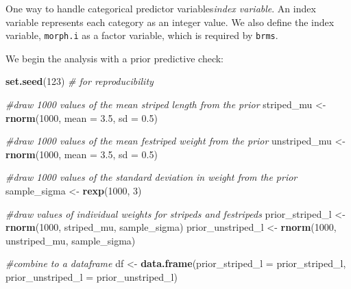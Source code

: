\documentclass[
]{book}
\newenvironment{Shaded}{\begin{snugshade}}{\end{snugshade}}
\newcommand{\AttributeTok}[1]{\textcolor[rgb]{0.13,0.29,0.53}{#1}}
\newcommand{\CommentTok}[1]{\textcolor[rgb]{0.56,0.35,0.01}{\textit{#1}}}
\newcommand{\DecValTok}[1]{\textcolor[rgb]{0.00,0.00,0.81}{#1}}
\newcommand{\FloatTok}[1]{\textcolor[rgb]{0.00,0.00,0.81}{#1}}
\newcommand{\FunctionTok}[1]{\textcolor[rgb]{0.13,0.29,0.53}{\textbf{#1}}}
\newcommand{\NormalTok}[1]{#1}
\newcommand{\OtherTok}[1]{\textcolor[rgb]{0.56,0.35,0.01}{#1}}
\begin{document}
One way to handle categorical predictor variables\emph{index variable}. An index variable represents each category as an integer value. We also define the index variable, \texttt{morph.i} as a factor variable, which is required by \texttt{brms}.

We begin the analysis with a prior predictive check:

\begin{Shaded}
\begin{Highlighting}[]
\FunctionTok{set.seed}\NormalTok{(}\DecValTok{123}\NormalTok{)  }\CommentTok{\# for reproducibility}

\CommentTok{\#draw 1000 values of the mean striped length from the prior}
\NormalTok{striped\_mu }\OtherTok{\textless{}{-}} \FunctionTok{rnorm}\NormalTok{(}\DecValTok{1000}\NormalTok{, }\AttributeTok{mean =} \FloatTok{3.5}\NormalTok{, }\AttributeTok{sd =} \FloatTok{0.5}\NormalTok{)}

\CommentTok{\#draw 1000 values of the mean festriped weight from the prior}
\NormalTok{unstriped\_mu }\OtherTok{\textless{}{-}} \FunctionTok{rnorm}\NormalTok{(}\DecValTok{1000}\NormalTok{, }\AttributeTok{mean =} \FloatTok{3.5}\NormalTok{, }\AttributeTok{sd =} \FloatTok{0.5}\NormalTok{)}

\CommentTok{\#draw 1000 values of the standard deviation in weight from the prior}
\NormalTok{sample\_sigma }\OtherTok{\textless{}{-}} \FunctionTok{rexp}\NormalTok{(}\DecValTok{1000}\NormalTok{, }\DecValTok{3}\NormalTok{)}

\CommentTok{\#draw values of individual weights for stripeds and festripeds}
\NormalTok{prior\_striped\_l }\OtherTok{\textless{}{-}} \FunctionTok{rnorm}\NormalTok{(}\DecValTok{1000}\NormalTok{, striped\_mu, sample\_sigma)}
\NormalTok{prior\_unstriped\_l }\OtherTok{\textless{}{-}} \FunctionTok{rnorm}\NormalTok{(}\DecValTok{1000}\NormalTok{, unstriped\_mu, sample\_sigma)}

\CommentTok{\#combine to a dataframe}
\NormalTok{df }\OtherTok{\textless{}{-}} \FunctionTok{data.frame}\NormalTok{(}\AttributeTok{prior\_striped\_l =}\NormalTok{ prior\_striped\_l,}
                 \AttributeTok{prior\_unstriped\_l =}\NormalTok{ prior\_unstriped\_l)}


\end{Highlighting}
\end{Shaded}
\end{document}
